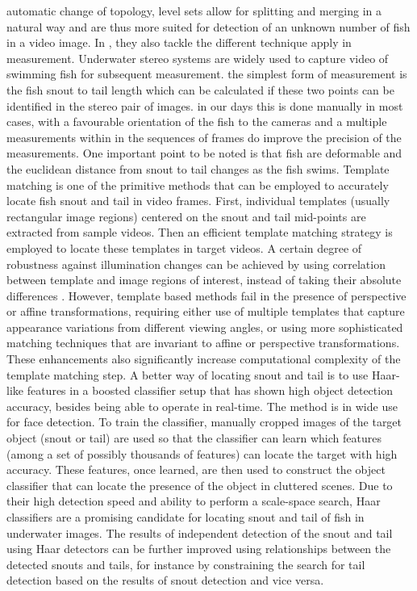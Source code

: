 automatic change of topology, level sets allow for splitting 
and merging in a natural way and are thus more suited for detection of an unknown
number of fish in a video image. 
In \citet{Shortis2013}, they also tackle the different technique apply in measurement.
Underwater stereo systems are widely used to capture video of swimming fish for 
subsequent measurement. the simplest form of measurement is the fish snout to tail 
length which can be calculated if these two points can be identified in the stereo 
pair of images. in our days this is done manually in most cases, with a favourable 
orientation of the fish to the cameras and a multiple measurements within in the 
sequences of frames do improve the precision of the measurements. One important 
point to be noted is that fish are deformable and the euclidean distance from snout to tail
changes as the fish swims.
Template matching is one of the primitive methods that can be employed to accurately 
locate fish snout and tail in video frames. First, individual templates (usually 
rectangular image regions) centered on the snout and tail mid-points are extracted 
from sample videos. Then an efficient template matching strategy is employed to 
locate these templates in target videos. A certain degree of robustness against 
illumination changes can be achieved by using correlation between template and 
image regions of interest, instead of taking their absolute differences \citet{Mahmood2012}.
However, template based methods fail in the presence of perspective or affine transformations, 
requiring either use of multiple templates that capture appearance variations from 
different viewing angles, or using more sophisticated matching techniques that are 
invariant to affine or perspective transformations. 
These enhancements also significantly increase computational complexity of the template matching step.
A better way of locating snout and tail is to use Haar-like features in a boosted 
classifier setup \citet{Viola2001} that has shown high object detection accuracy, 
besides being able to operate in real-time. The method is in wide use for face detection.
To train the classifier, manually cropped images of the target object (snout or tail) are used so that the classifier can learn which features (among a set of possibly thousands of features) can locate the target with high accuracy. These features, once learned, are then used to construct the object classifier that can locate the presence of the object in cluttered scenes. Due to their high detection speed and ability to perform a scale-space search, Haar classifiers are a promising candidate for locating snout and tail of fish in underwater images. The results of independent detection of the snout and tail using Haar detectors can be further improved using relationships between the detected snouts and tails, for instance by constraining the search for tail detection based on the results of snout detection and vice versa.

